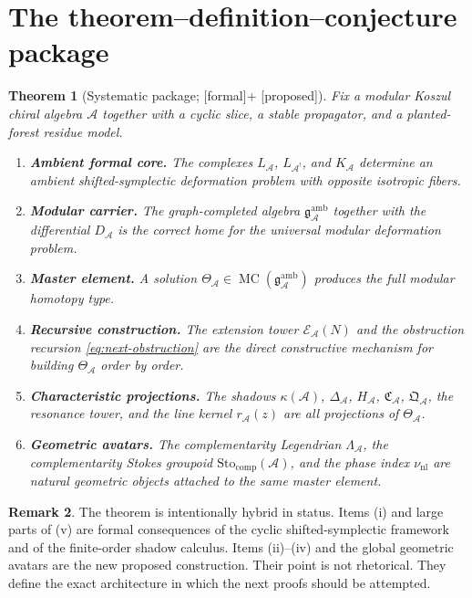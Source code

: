 \documentclass[11pt,oneside]{memoir}
\numberwithin{equation}{chapter}
\newtheorem{theorem}{Theorem}[chapter]
\theoremstyle{definition}
\newtheorem{remark}[theorem]{Remark}
\newcommand{\ClaimStatusConjectured}{\textnormal{[proposed]}}
\newcommand{\ClaimStatusFormal}{\textnormal{[formal]}}
\newcommand{\cA}{\mathcal A}
\newcommand{\cE}{\mathcal E}
\newcommand{\fg}{\mathfrak g}
\newcommand{\MC}{\operatorname{MC}}
\begin{document}
\section{The theorem--definition--conjecture package}

\begin{theorem}[Systematic package; \ClaimStatusFormal + \ClaimStatusConjectured]
\label{thm:systematic-package}
Fix a modular Koszul chiral algebra \(\cA\) together with a cyclic slice, a stable propagator, and a planted-forest residue model.
\begin{enumerate}[label=\textup{(\roman*)},leftmargin=2.8em]
\item \textbf{Ambient formal core.}  The complexes \(L_{\cA}\), \(L_{\cA^!}\), and \(K_{\cA}\) determine an ambient shifted-symplectic deformation problem with opposite isotropic fibers.
\item \textbf{Modular carrier.}  The graph-completed algebra \(\fg^{\mathrm{amb}}_{\cA}\) together with the differential \(D_{\cA}\) is the correct home for the universal modular deformation problem.
\item \textbf{Master element.}  A solution \(\Theta_{\cA}\in \MC(\fg^{\mathrm{amb}}_{\cA})\) produces the full modular homotopy type.
\item \textbf{Recursive construction.}  The extension tower \(\cE_{\cA}(N)\) and the obstruction recursion \eqref{eq:next-obstruction} are the direct constructive mechanism for building \(\Theta_{\cA}\) order by order.
\item \textbf{Characteristic projections.}  The shadows \(\kappa(\cA)\), \(\Delta_{\cA}\), \(H_{\cA}\), \(\mathfrak C_{\cA}\), \(\mathfrak Q_{\cA}\), the resonance tower, and the line kernel \(r_{\cA}(z)\) are all projections of \(\Theta_{\cA}\).
\item \textbf{Geometric avatars.}  The complementarity Legendrian \(\Lambda_{\cA}\), the complementarity Stokes groupoid \(\mathrm{Sto}_{\mathrm{comp}}(\cA)\), and the phase index \(\nu_{\mathrm{nl}}\) are natural geometric objects attached to the same master element.
\end{enumerate}
\end{theorem}

\begin{remark}
The theorem is intentionally hybrid in status.  Items \textup{(i)} and large parts of \textup{(v)} are formal consequences of the cyclic shifted-symplectic framework and of the finite-order shadow calculus.  Items \textup{(ii)}--\textup{(iv)} and the global geometric avatars are the new proposed construction.  Their point is not rhetorical.  They define the exact architecture in which the next proofs should be attempted.
\end{remark}
\end{document}

